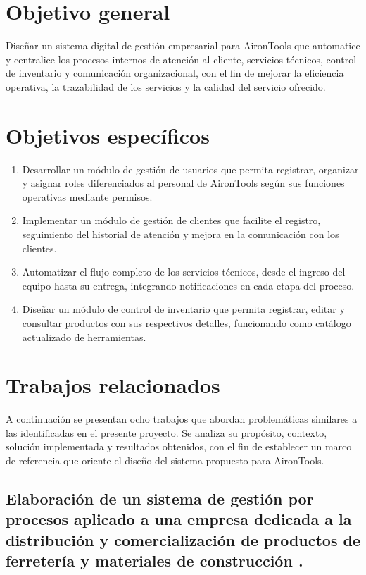 \section{Objetivo general}
Diseñar un sistema digital de gestión empresarial para AironTools que automatice y centralice los procesos internos de atención al cliente, servicios técnicos, control de inventario y comunicación organizacional, con el fin de mejorar la eficiencia operativa, la trazabilidad de los servicios y la calidad del servicio ofrecido.

\section{Objetivos específicos}
\begin{enumerate}
	\item Desarrollar un módulo de gestión de usuarios que permita registrar, organizar y asignar roles diferenciados al personal de AironTools según sus funciones operativas mediante permisos.

	\item Implementar un módulo de gestión de clientes que facilite el registro, seguimiento del historial de atención y mejora en la comunicación con los clientes.

	\item Automatizar el flujo completo de los servicios técnicos, desde el ingreso del equipo hasta su entrega, integrando notificaciones en cada etapa del proceso.

	\item Diseñar un módulo de control de inventario que permita registrar, editar y consultar productos con sus respectivos detalles, funcionando como catálogo actualizado de herramientas.
\end{enumerate}

\section{Trabajos relacionados}

A continuación se presentan ocho trabajos que abordan problemáticas similares a las identificadas en el presente proyecto. Se analiza su propósito, contexto, solución implementada y resultados obtenidos, con el fin de establecer un marco de referencia que oriente el diseño del sistema propuesto para AironTools.

\subsection{Elaboración de un sistema de gestión por procesos aplicado a una empresa dedicada a la distribución y comercialización de productos de ferretería y materiales de construcción \cite{Vargas2018}.}

